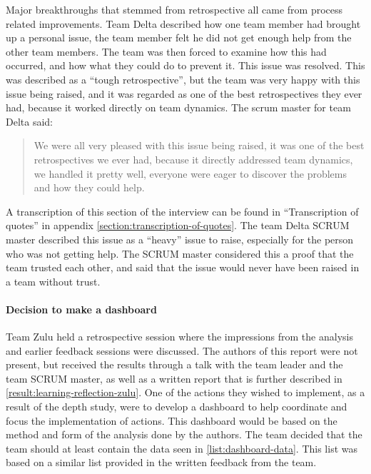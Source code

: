 \label{question-21}
Major breakthroughs that stemmed from retrospective all came from process related improvements. Team Delta described how one team member had brought up a personal issue, the team member felt he did not get enough help from the other team members. The team was then forced to examine how this had occurred, and how what they could do to prevent it. This issue was resolved. This was described as a ``tough retrospective'', but the team was very happy with this issue being raised, and it was regarded as one of the best retrospectives they ever had, because it worked directly on team dynamics. The scrum master for team Delta said:

\begin{quote}
We were all very pleased with this issue being raised, it was one of the best retrospectives we ever had, because it directly addressed team dynamics, we handled it pretty well, everyone were eager to discover the problems and how they could help.
\end{quote}

A transcription of this section of the interview can be found in ``Transcription of quotes'' in appendix \autoref{section:transcription-of-quotes}.
The team Delta SCRUM master described this issue as a ``heavy'' issue to raise, especially for the person who was not getting help. The SCRUM master considered this a proof that the team trusted each other, and said that the issue would never have been raised in a team without trust.

\paragraph{Decision to make a dashboard}
\label{dashboard}
Team Zulu held a retrospective session where the impressions from the analysis and earlier feedback sessions were discussed. The authors of this report were not present, but received the results through a talk with the team leader and the team SCRUM master, as well as a written report that is further described in \autoref{result:learning-reflection-zulu}. One of the actions they wished to implement, as a result of the depth study, were to develop a dashboard to help coordinate and focus the implementation of actions. This dashboard would be based on the method and form of the analysis done by the authors. The team decided that the team should at least contain the data seen in \autoref{list:dashboard-data}. This list was based on a similar list provided in the written feedback from the team. 

